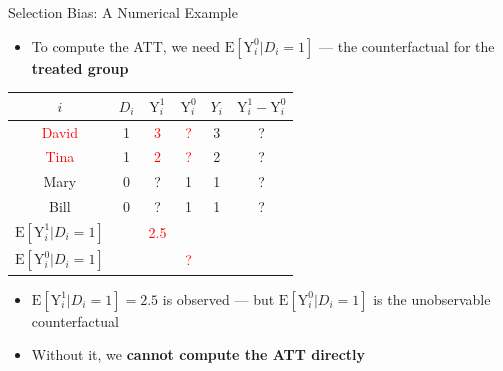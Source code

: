\documentclass[hyperref={pdfpagelabels=false}]{beamer}
\begin{document}
\begin{frame}{Selection Bias: A Numerical Example}
	\begin{itemize}
		\item To compute the ATT, we need $\mathrm{E}[\mathrm{Y}^{0}_{i}|D_i=1]$ --- the counterfactual for the \textbf{treated group}
	\end{itemize}
	\vspace{0.1cm}
	\begin{center}
		\begin{threeparttable}
			\centering\footnotesize
			\begin{tabular}{cccccc}
				\toprule
				$i$ & $D_i$ & $\mathrm{Y}^{1}_{i}$ & $\mathrm{Y}^{0}_{i}$ & $Y_i$ & $\mathrm{Y}^{1}_{i}-\mathrm{Y}^{0}_{i}$ \\
				\midrule
				\textcolor{red}{David} & 1 & \textcolor{red}{3} & \textcolor{red}{?} & 3 & ? \\
				\textcolor{red}{Tina}  & 1 & \textcolor{red}{2} & \textcolor{red}{?} & 2 & ? \\
				Mary  & 0 & ? & 1 & 1 & ? \\
				Bill  & 0 & ? & 1 & 1 & ? \\
				\midrule
				$\mathrm{E}[\mathrm{Y}^{1}_{i}|D_i=1]$ & & \textcolor{red}{2.5} & & & \\
				$\mathrm{E}[\mathrm{Y}^{0}_{i}|D_i=1]$ & & & \textcolor{red}{?} & & \\
				\bottomrule
			\end{tabular}
		\end{threeparttable}
	\end{center}
	\vspace{0.2cm}
	\begin{itemize}
		\item $\mathrm{E}[\mathrm{Y}^{1}_{i}|D_i=1] = 2.5$ is observed --- but $\mathrm{E}[\mathrm{Y}^{0}_{i}|D_i=1]$ is the unobservable counterfactual
		\item Without it, we \textbf{cannot compute the ATT directly}
	\end{itemize}
\end{frame}
	
\end{document}
